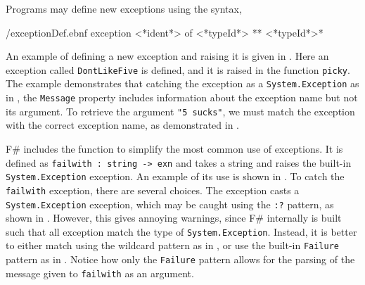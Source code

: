 \documentclass[fsharpNotes.tex]{subfiles}
\begin{document}
Programs may define new exceptions using the syntax,
%
\begin{verbatimwrite}{\ebnf/exceptionDef.ebnf}
exception <*ident*> of <*typeId*> {** <*typeId*>*} 
\end{verbatimwrite}
%
An example of defining a new exception and raising it is given in .
%
%
Here an exception called \lstinline!DontLikeFive! is defined, and it is raised in the function \lstinline!picky!. The example demonstrates that catching the exception as a \lstinline{System.Exception} as in , the \lstinline{Message} property includes information about the exception name but not its argument. To retrieve the argument \lstinline{"5 sucks"}, we must match the exception with the correct exception name, as demonstrated in . 
%
%

F\# includes the  function to simplify the most common use of exceptions. It is defined as \lstinline!failwith : string -> exn! and takes a string and raises the built-in \lstinline!System.Exception! exception. An example of its use is shown in .
%
%
To catch the \lstinline!failwith! exception, there are several choices. The exception casts a \lstinline!System.Exception! exception, which may be caught using the \lstinline!:?! pattern, as shown in .
%
%
However, this gives annoying warnings, since F\# internally is built such that all exception match the type of \lstinline!System.Exception!. Instead, it is better to either match using the wildcard pattern as in ,
%
%
or use the built-in \lstinline!Failure! pattern as in .
%
%
Notice how only the \lstinline!Failure! pattern allows for the parsing of the message given to \lstinline!failwith! as an argument.
\end{document}
